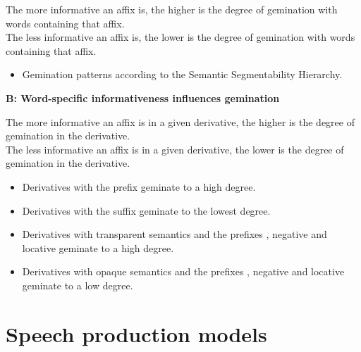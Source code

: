 {\noindent		The more informative an affix is, the higher is the degree of gemination with words containing that affix. \\
		
\noindent	The less informative an affix is, the lower is the degree of gemination with words 
		containing that affix. 
	
				\begin{itemize}
	\item	Gemination patterns according to the Semantic Segmentability Hierarchy. 		\\
		

\end{itemize}


	
\noindent	\textbf{B: \hspace{0.5cm} Word-specific informativeness influences gemination}\vspace{0.2 cm}
	
\noindent	The more informative an affix is in a given derivative, the higher is the degree of gemination in the derivative.\\ 


	
\noindent	The less informative an affix is in a given derivative, the lower is the degree of gemination in the derivative.%
	
			\begin{itemize}
				
				\item Derivatives with the prefix  geminate to a high degree.		
				\item Derivatives with the suffix  geminate to the lowest degree.
				\item  Derivatives with transparent semantics and the prefixes , negative  and locative  geminate to a high degree.	
				\item  Derivatives with opaque semantics and the prefixes , negative  and locative  geminate to a low degree.	\\
			\end{itemize}	



 
\section{Speech production models}\label{speech production models}

}
